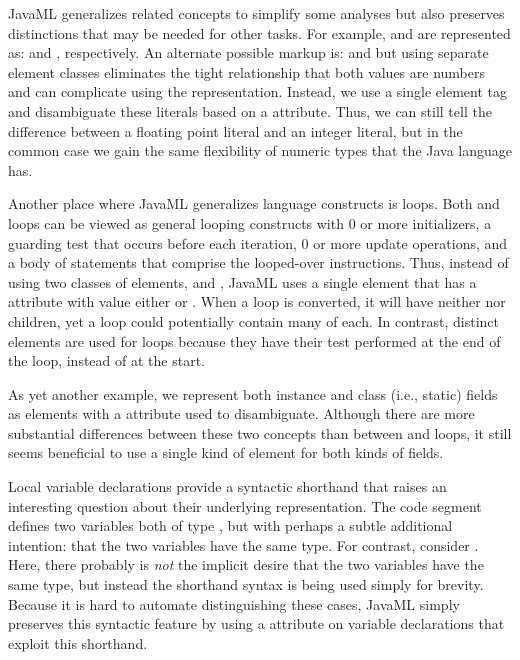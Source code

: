 \documentclass{article}
\begin{document}
\begin{multicols}{2}
JavaML generalizes related concepts to simplify some analyses but also
preserves distinctions that may be needed for other tasks.  For example,
 and  are represented as:
 and
, respectively.  An
alternate possible markup is: 
and  but using separate element
classes eliminates the tight relationship that both values are numbers
and can complicate using the representation.  Instead, we use a single
element tag and disambiguate these literals based on a 
attribute. Thus, we can still tell the difference between a floating
point literal and an integer literal, but in the common case we gain the
same flexibility of numeric types that the Java language has.

Another place where JavaML generalizes language constructs is loops.
Both  and  loops can be viewed as general
looping constructs with 0 or more initializers, a guarding test that
occurs before each iteration, 0 or more update operations, and a body of
statements that comprise the looped-over instructions.  Thus, instead of
using two classes of elements,  and
, JavaML uses a single  element that
has a  attribute with value either  or
.  When a  loop is converted, it will
have neither  nor  children, yet
a  loop could potentially contain many of each.  In
contrast, distinct  elements are used for
 loops because they have their test performed at the end of
the loop, instead of at the start.

      
As yet another example, we represent both instance and class (i.e.,
static) fields as  elements with a 
attribute used to disambiguate.  Although there are more substantial
differences between these two concepts than between 
and  loops, it still seems beneficial to use a single
kind of element for both kinds of fields.

Local variable declarations provide a syntactic shorthand that raises an
interesting question about their underlying representation.  The code
segment  defines two variables both of type
, but with perhaps a subtle additional intention: that the
two variables have the same type.  For contrast, consider .  Here, there probably is \emph{not} the implicit desire
that the two variables have the same type, but instead the shorthand
syntax is being used simply for brevity.  Because it is hard to automate
distinguishing these cases, JavaML simply preserves this syntactic
feature by using a  attribute on variable
declarations that exploit this shorthand.


\end{multicols}
\end{document}
